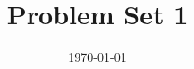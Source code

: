 \documentclass[a4paper]{article}
\date{\today}
\title{Problem Set 1}
\begin{document}
\header{}

\onehalfspacing

\pagebreak

\pagebreak

\pagebreak





\end{document}

